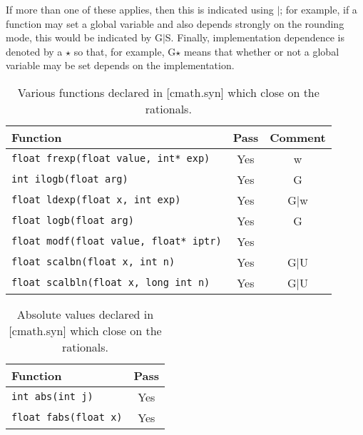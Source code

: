 \documentclass[prd,twocolumn,amsmath,amssymb,nofootinbib,eqsecnum]{revtex4-1}
\newcommand{\code}[1]{{\tt #1}}
\begin{document}
If more than one of these applies, then this is indicated using $\vert$; for example, if a function may set a global variable and also depends strongly on the rounding mode, this would be indicated by G$\vert$S. Finally, implementation dependence is denoted by a $\star$ so that, for example, G$\star$ means that whether or not a global variable may be set depends on the implementation.
\begin{table}[h]
	\begin{tabular}{lcc}
		Function & Pass & Comment
	\\
	\hline \hline
		\code{float frexp(float value, int* exp)} & Yes & w
	\\
	\hline
		\code{int ilogb(float arg)} & Yes & G
	\\
	\hline
		\code{float ldexp(float x, int exp)} & Yes & G$\vert$w		
	\\
	\hline
		\code{float logb(float arg)} & Yes & G
	\\
	\hline
		\code{float modf(float value, float* iptr)} & Yes &
	\\
	\hline
		\code {float scalbn(float x, int n)} & Yes & G$\vert$U
	\\
	\hline
		\code {float scalbln(float x, long int n)} & Yes & G$\vert$U
	\end{tabular}
\caption{Various functions declared in [cmath.syn] which close on the rationals.}
\label{tab:26.9.1}
\end{table}


\begin{table}[h]
	\begin{tabular}{lc}
		Function & Pass
	\\
	\hline \hline
		\code{int abs(int j)} & Yes
	\\
	\hline
		\code{float fabs(float x)} & Yes
	\end{tabular}
\caption{Absolute values declared in [cmath.syn]  which close on the rationals.}
\label{tab:26.9.2}
\end{table}
\end{document}
